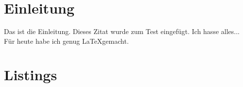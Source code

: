 \chapter{Einleitung}

Das ist die Einleitung.\cite{test} Dieses Zitat wurde zum Test eingefügt.
Ich hasse alles... Für heute habe ich genug \LaTeX gemacht.

\chapter{Listings}



